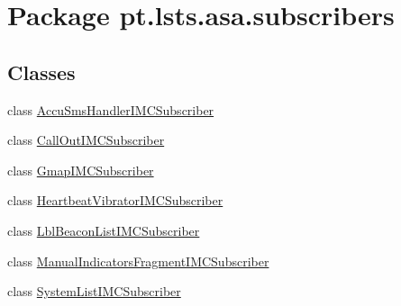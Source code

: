 \hypertarget{namespacept_1_1lsts_1_1asa_1_1subscribers}{}\section{Package pt.\+lsts.\+asa.\+subscribers}
\label{namespacept_1_1lsts_1_1asa_1_1subscribers}
\subsection*{Classes}
\begin{DoxyCompactItemize}
\item 
class \hyperlink{classpt_1_1lsts_1_1asa_1_1subscribers_1_1AccuSmsHandlerIMCSubscriber}{Accu\+Sms\+Handler\+I\+M\+C\+Subscriber}
\item 
class \hyperlink{classpt_1_1lsts_1_1asa_1_1subscribers_1_1CallOutIMCSubscriber}{Call\+Out\+I\+M\+C\+Subscriber}
\item 
class \hyperlink{classpt_1_1lsts_1_1asa_1_1subscribers_1_1GmapIMCSubscriber}{Gmap\+I\+M\+C\+Subscriber}
\item 
class \hyperlink{classpt_1_1lsts_1_1asa_1_1subscribers_1_1HeartbeatVibratorIMCSubscriber}{Heartbeat\+Vibrator\+I\+M\+C\+Subscriber}
\item 
class \hyperlink{classpt_1_1lsts_1_1asa_1_1subscribers_1_1LblBeaconListIMCSubscriber}{Lbl\+Beacon\+List\+I\+M\+C\+Subscriber}
\item 
class \hyperlink{classpt_1_1lsts_1_1asa_1_1subscribers_1_1ManualIndicatorsFragmentIMCSubscriber}{Manual\+Indicators\+Fragment\+I\+M\+C\+Subscriber}
\item 
class \hyperlink{classpt_1_1lsts_1_1asa_1_1subscribers_1_1SystemListIMCSubscriber}{System\+List\+I\+M\+C\+Subscriber}
\end{DoxyCompactItemize}
